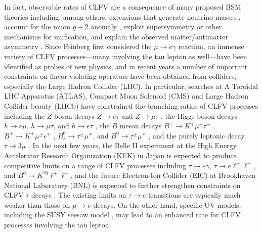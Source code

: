 \documentclass{book}[letterpaper,12pt]
\begin{document}
In fact, observable rates of CLFV are a consequence of many proposed BSM theories including, among others, extensions that generate neutrino masses \cite{PhysRevD.67.076006,Abada:2015oba}, account for the muon $g-2$ anomaly \cite{Lindner:2016bgg,Li:2021lnz}, exploit supersymmetry \cite{Carvalho:2002bq,PhysRevD.74.116002,Figueiredo:2013tea,Gomez:2017dhl} or other mechanisms \cite{Ciafaloni:1995ad,Benbrik:2010cf,Feldmann:2016hvo} for unification, and explain the observed matter/antimatter asymmetry \cite{PhysRevD.83.076007,Merlo:2018rin}. Since Feinberg first considered the $\mu\rightarrow e\gamma$ reaction, an immense variety of CLFV processes---many involving the tau lepton as well---have been identified as probes of new physics, and in recent years a number of important constraints on flavor-violating operators have been obtained from colliders, especially the Large Hadron Collider (LHC). In particular, searches at A Toroidal LHC Apparatus (ATLAS), Compact Muon Solenoid (CMS) and Large Hadron Collider beauty (LHCb) have constrained the branching ratios of CLFV processes including the $Z$ boson decays $Z\rightarrow e\tau$ and $Z\rightarrow \mu\tau$ \cite{ATLAS:2020zlz,ATLAS:2021bdj}, the Higgs boson decays $h\rightarrow e\mu$, $h\rightarrow \mu\tau$, and $h\rightarrow e\tau$ \cite{ATLAS:2016joj,CMS:2017con,CMS:2021rsq}, the $B$ meson decays $B^+\rightarrow K^+\mu^-\tau^+$ \cite{LHCb:2020khb}, $B^+\rightarrow K^+\mu^{\pm}e^{\mp}$ \cite{LHCb:2019bix}, $B_s^{0}\rightarrow \tau^{\pm}\mu^{\mp}$, and $B^0\rightarrow \tau^{\pm}\mu^{\mp}$ \cite{LHCb:2019ujz}, and the purely leptonic decay $\tau\rightarrow 3\mu$ \cite{LHCb:2014kws,ATLAS:2016jts,CMS:2020kwy}. In the next few years, the Belle II experiment \cite{Belle-II:2018jsg} at the High Energy Accelerator Research Organization (KEK) in Japan is expected to produce competitive limits on a range of CLFV processes including $\tau\rightarrow e\gamma$, $\tau\rightarrow e\ell^+\ell^-$, and $B^0\rightarrow K^{*0}\ell^+\ell^-$, and the future Electron-Ion Collider (EIC) \cite{AbdulKhalek:2022erw} at Brookhaven National Laboratory (BNL) is expected to further strengthen constraints on CLFV $\tau$ decays \cite{Cirigliano:2021img}. The existing limits on $\tau\rightarrow e$ transitions are typically much weaker than those on $\mu\rightarrow e$ decays. On the other hand, specific UV models, including the SUSY seesaw model \cite{Ellis:1999uq}, may lead to an enhanced rate for CLFV processes involving the tau lepton.
\end{document}
